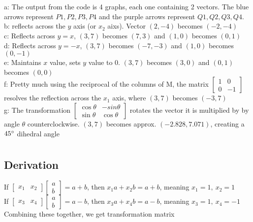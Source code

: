 \documentclass{article}
\begin{document}
\section{}
a: The output from the code is 4 graphs, each one containing 2 vectors. The blue arrows represent $P1, P2, P3, P4$ and the purple arrows represent $Q1,Q2,Q3,Q4$. 
\\[0.05in]b: reflects across the $y$ axis (or $x_2$ aixs). Vector $(2,-4)$ becomes $(-2,-4)$
\\[0.05in]c: Reflects across $y=x$, $(3,7)$ becomes $(7,3)$ and $(1,0)$ becomes $(0,1)$
\\[0.05in]d: Reflects across $y=-   x$, $(3,7)$ becomes $(-7,-3)$ and $(1,0)$ becomes $(0,-1)$
\\[0.05in]e: Maintains $x$ value, sets $y$ value to $0$. $(3,7)$ becomes $(3,0)$ and $(0,1)$ becomes $(0,0)$
\\[0.05in]f: Pretty much using the reciprocal of the columns of M, the matrix $\begin{bmatrix}1&0\\0&-1\end{bmatrix}$ resolves the reflection across the $x_1$ axis, where $(3,7)$ becomes $(-3,7)$
\\[0.05in]g: The transformation $\begin{bmatrix}\cos\theta&-sin\theta\\\sin\theta&\cos\theta\end{bmatrix}$ rotates the vector it is multiplied by by angle $\theta$ counterclockwise. $(3,7)$ becomes approx. $(-2.828, 7.071)$, creating a $45\degree$ dihedral angle
\pagebreak
\section{}
\subsection{Derivation}
If $\begin{bmatrix}x_1&x_2\end{bmatrix}\begin{bmatrix}a\\b\end{bmatrix} = a+b$, then $x_1a+x_2b=a+b$, meaning $x_1=1,~x_2=1$
\\[0.05in]If $\begin{bmatrix}x_3&x_4\end{bmatrix}\begin{bmatrix}a\\b\end{bmatrix} = a-b$, then $x_3a+x_4b=a-b$, meaning $x_3=1,~x_4=-1$
\\Combining these together, we get transformation matrix 
\end{document}
